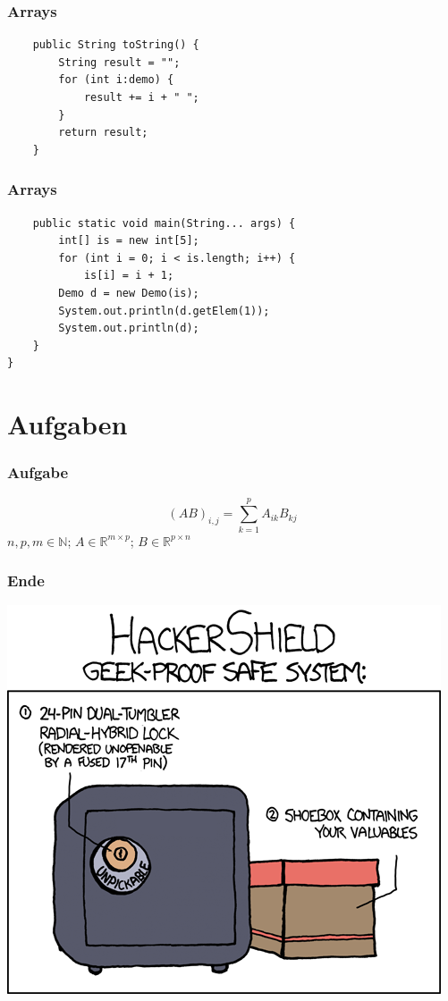 \documentclass{beamer}
\begin{document}
\begin{frame}[fragile]
\frametitle{Arrays}
\begin{verbatim}
    public String toString() {
        String result = "";
        for (int i:demo) {
            result += i + " ";
        }
        return result;
    }
\end{verbatim}
\end{frame}

\begin{frame}[fragile]
\frametitle{Arrays}
\begin{verbatim}
    public static void main(String... args) {
        int[] is = new int[5];
        for (int i = 0; i < is.length; i++) {
            is[i] = i + 1;
        Demo d = new Demo(is);
        System.out.println(d.getElem(1));
        System.out.println(d);
    }
}
\end{verbatim}
\end{frame}

\section{Aufgaben}
\begin{frame}
\frametitle{Aufgabe}
$$(AB)_{i,j}=\sum^{p}_{k=1}A_{ik}B_{kj}$$
$n,p,m\in\mathbb{N}$; $A\in{}\mathbb{R}^{m\times{}p}$;
$B\in\mathbb{R}^{p\times{}n}$
\end{frame}

\begin{frame}
\frametitle{Ende}
\includegraphics[scale=0.4]{unpickable-1.png}
\end{frame}
\end{document}
